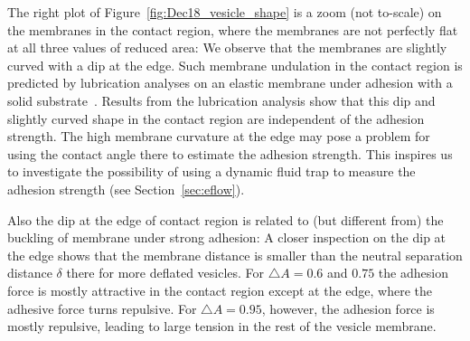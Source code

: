 \documentclass[prf,superscriptaddress,showkeys]{revtex4-1}
\begin{document}
The right plot of Figure~\ref{fig:Dec18_vesicle_shape} is a zoom (not
to-scale) on the membranes in the contact region, where the membranes
are not perfectly flat at all three values of reduced area: We observe
that the membranes are slightly curved with a dip at the edge.  Such
membrane undulation in the contact region is predicted by lubrication
analyses on an elastic membrane under adhesion with a solid
substrate~\cite{BlountMiksisDavis2013_PRSa, YoungStone2017_PRF}.  
%
Results from the lubrication analysis show that
this dip and slightly curved shape in the contact region are independent
of the adhesion strength. The high membrane curvature at the edge may
pose a problem for using the contact angle there to estimate the
adhesion strength. This inspires us to investigate the possibility of
using a dynamic fluid trap to measure the adhesion strength (see
Section~\ref{sec:eflow}).


Also the dip at the edge of contact region is
related to (but different from) the buckling of membrane under strong
adhesion: A closer inspection on the dip at the edge shows that the
membrane distance is smaller than the neutral separation distance
$\delta$ there for more deflated vesicles.
For $\triangle A =0.6$ and $0.75$  the adhesion force is mostly attractive
 in the contact region except at the edge, where the adhesive
force turns repulsive.  For $\triangle A=0.95$, however, the adhesion force is mostly repulsive,
leading to large tension in the rest of the vesicle membrane.
\end{document}
